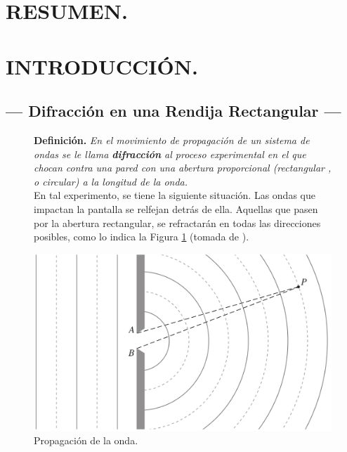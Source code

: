 \documentclass[12pt,a4paper]{article}
\begin{document}
\portada

\section{RESUMEN.} %

\section{INTRODUCCIÓN.} %

\subsection{--- Difracción en una Rendija Rectangular ---} %
\label{sub:difraccion_una}
\begin{figure}[hbtp!]
\begin{minipage}{0.55\linewidth}
	\textbf{Definición.} \textit{En el movimiento de propagación de un sistema de ondas se le llama \textbf{difracción} al proceso experimental en el que chocan contra una pared con una abertura proporcional (rectangular , o circular) a la longitud de la onda.} \\[2mm]
 	En tal experimento, se tiene la siguiente situación.
	Las ondas que impactan la pantalla se relfejan detrás de ella.
	Aquellas que pasen por la abertura rectangular, se refractarán en todas las direcciones posibles, como lo indica la Figura \ref{fig:rectang} (tomada de ).
\end{minipage}\hspace{5mm}
\begin{minipage}{0.45\linewidth}
	\includegraphics[width= 0.9 \linewidth]{1_INTRO/direcciones.png}
	\caption{Propagación de la onda.}
	\label{fig:rectang}
\end{minipage}
\end{figure}
\end{document}
